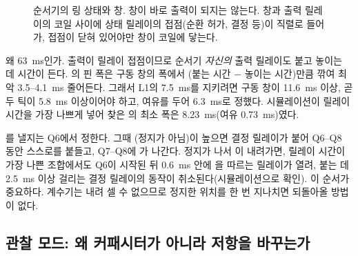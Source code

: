 \begin{figure}[ht]
\centering
{}
\caption{순서기의 링 상태와 창. 창이 바로 출력이 되지는 않는다. 창과 출력 릴레이의 코일 사이에 상태 릴레이의
접점(순환 허가,  결정 등)이 직렬로 들어가, 접점이 닫혀 있어야만 창이 코일에 닿는다.}
\label{fig:t-ring}
\end{figure}

왜 63~ms인가. 출력이 릴레이 접점이므로 순서기 \emph{자신의} 출력 릴레이도 붙고 놓이는 데 시간이 든다.
의 핀 폭은 구동 창의 폭에서 (붙는 시간 $-$ 놓이는 시간)만큼 깎여 최악 3.5--4.1~ms 줄어든다. 그래서
L1의 7.5~ms를 지키려면 구동 창이 11.6~ms 이상, 곧 두 틱이 5.8~ms 이상이어야 하고, 여유를 두어 6.3~ms로 정했다.
시뮬레이션이 릴레이 시간을 가장 나쁘게 넣어 찾은 의 최소 폭은 8.23~ms(여유 0.73~ms)였다.

를 낼지는 Q6에서 정한다. 그때 (정지가 아님)이 높으면  결정 릴레이가 붙어 Q6--Q8 동안
스스로를 붙들고, Q7--Q8에 가 나간다. 정지가 나서 이 내려가면, 릴레이 시간이 가장 나쁜
조합에서도 Q6이 시작된 뒤 0.6~ms 안에 을 따르는 릴레이가 열려, 붙는 데 2.5~ms 이상 걸리는 결정
릴레이의 동작이 취소된다(시뮬레이션으로 확인). 이 순서가 중요하다. 계수기는 내려 셀 수 없으므로 정지한 위치를 한 번 지나치면 되돌아올
방법이 없다.

\subsection{관찰 모드: 왜 커패시터가 아니라 저항을 바꾸는가}

